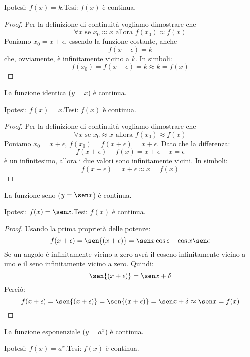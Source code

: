 \noindent Ipotesi: \(f(x)=k\).\tab Tesi: \(f(x)\) è continua.

\begin{proof}
Per la definizione di continuità vogliamo dimostrare che 
\[\forall x \text{ se } x_0 \approx x \text{ allora } f(x_0) \approx f(x)\]
Poniamo \(x_0=x+\epsilon\), essendo la funzione costante, anche 
\[f(x+\epsilon)=k\] 
che, ovviamente, è infinitamente vicino a \(k\). In simboli:
\[f(x_0) = f(x+\epsilon) = k \approx k = f(x)\] 
\end{proof}

\begin{teorema}
La funzione identica (\(y=x\)) è continua.
\end{teorema}

\noindent Ipotesi: \(f(x)=x\).\tab Tesi: \(f(x)\) è continua.

\begin{proof}
Per la definizione di continuità vogliamo dimostrare che 
\[\forall x \text{ se } x_0 \approx x \text{ allora } f(x_0) \approx f(x)\]
Poniamo \(x_0=x+\epsilon\), \(f(x_0) = f(x+\epsilon)=x+\epsilon\). 
Dato che la differenza:
\[f(x+\epsilon)-f(x) = x+\epsilon-x= \epsilon\]
è un infinitesimo, allora i due valori sono infinitamente vicini. In simboli:
\[f(x+\epsilon) = x+\epsilon \approx x = f(x)\] 
\end{proof}

\begin{teorema}
La funzione seno (\(y=\sen x\)) è continua.
\end{teorema}

\noindent Ipotesi: \(f(x)=\sen x\).\tab Tesi: \(f(x)\) è continua.

\begin{proof}
Usando la prima proprietà delle potenze:
\[f(x+\epsilon) =
\sen{(x+\epsilon)} = \sen x \cos \epsilon - \cos x \sen \epsilon\]
Se un angolo è infinitamente vicino a zero avrà il coseno infinitamente vicino 
a uno e il seno infinitamente vicino a zero. Quindi:
\[\sen{(x+\epsilon)} = \sen x + \delta\]
Perciò:
\[f(x+\epsilon) =
\sen{(x+\epsilon)} = \sen{(x+\epsilon)} = 
\sen x + \delta \approx \sen x = f(x)\]
\end{proof}

\begin{teorema}
La funzione esponenziale (\(y=a^x\)) è continua.
\end{teorema}

\noindent Ipotesi: \(f(x)=a^x\).\tab Tesi: \(f(x)\) è continua.

